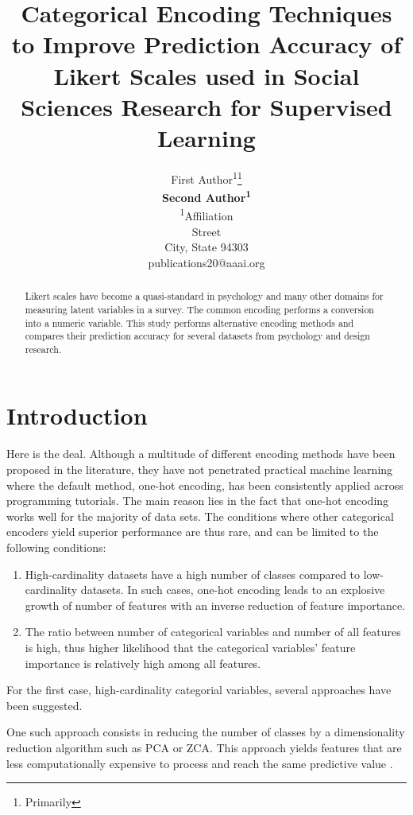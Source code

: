 \documentclass[letterpaper]{article} %
\title{Categorical Encoding Techniques to Improve Prediction Accuracy of Likert Scales used in Social Sciences Research for Supervised Learning}
\author{First Author\textsuperscript{\rm 1}\thanks{Primarily }\\ \Large \textbf{Second Author\textsuperscript{\rm 1}}\\ %
\textsuperscript{\rm 1}Affiliation\\ %
Street\\
City, State 94303\\
publications20@aaai.org %
}
\begin{document}
\maketitle

\begin{abstract}
Likert scales have become a quasi-standard in psychology and many other domains for measuring latent variables in a survey. The common encoding performs a conversion into a numeric variable. This study performs alternative encoding methods and compares their prediction accuracy for several datasets from psychology and design research.

\end{abstract}


\section{Introduction}
\noindent Here is the deal.
Although a multitude of different encoding methods have been proposed in the literature, they have not penetrated practical machine learning where the default method, one-hot encoding, has been consistently applied across programming tutorials. The main reason lies in the fact that one-hot encoding works well for the majority of data sets. The conditions where other categorical encoders yield superior performance are thus rare, and can be limited to the following conditions:
\begin{enumerate}
\item High-cardinality datasets have a high number of classes compared to low-cardinality datasets. In such cases, one-hot encoding leads to an explosive growth of number of features with an inverse reduction of feature importance.
\item The ratio between number of categorical variables and number of all features is high, thus higher likelihood that the categorical variables' feature importance is relatively high among all features.
\end{enumerate}

For the first case, high-cardinality categorial variables, several approaches have been suggested.

One such approach consists in reducing the number of classes by a dimensionality reduction algorithm such as PCA or ZCA. This approach yields features that are less computationally expensive to process and reach the same predictive value \cite{bibid}.
\end{document}
